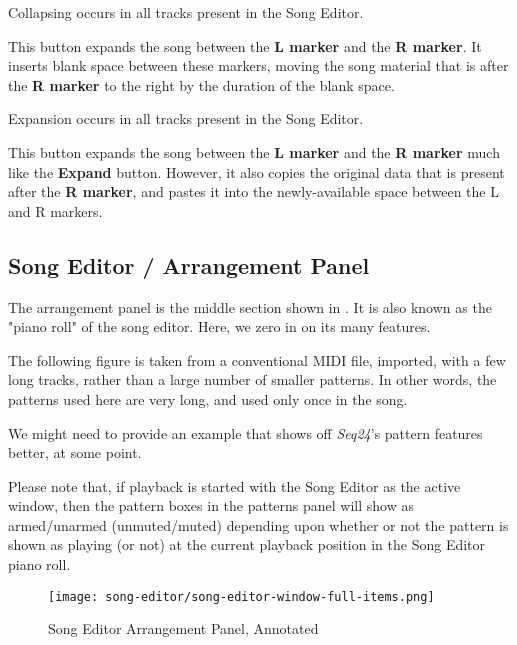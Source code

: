    Collapsing occurs in all tracks present in the Song Editor.

   This button expands the song between the
   \textbf{L marker} and the \textbf{R marker}.
   It inserts blank space between these markers, moving the song material
   that is after the \textbf{R marker}
   to the right by the duration of the blank space.

   Expansion occurs in all tracks present in the Song Editor.

   This button expands the song between the \textbf{L marker} and the
   \textbf{R marker} much like the \textbf{Expand} button.
   However, it also copies the original data that is present after the
   \textbf{R marker}, and pastes it into the newly-available space between
   the L and R markers.

\subsection{Song Editor / Arrangement Panel}
\label{subsec:seq24_song_editor_arrangement_panel}

   The arrangement panel is the middle section shown in
   .  It is also known as the
   "piano roll" of the song editor. Here, we zero in on its many
   features.

   The following figure is taken from a conventional MIDI file, imported,
   with a few long tracks, rather than a large number of smaller patterns.
   In other words, the patterns used here are very long, and used only once
   in the song.
   
   We might need to provide an example that shows off \textsl{Seq24}'s
   pattern features better, at some point.

   Please note that, if playback is started with the Song Editor as the
   active window, then the pattern boxes in the patterns panel will
   show as armed/unarmed (unmuted/muted) depending upon whether or not the
   pattern is shown as playing (or not) at the current playback position in
   the Song Editor piano roll.

\begin{figure}[H]
   \centering 
   \texttt{[image: song-editor/song-editor-window-full-items.png]}
   \caption{Song Editor Arrangement Panel, Annotated}
   \label{fig:song_editor_window_full_items}
\end{figure}

